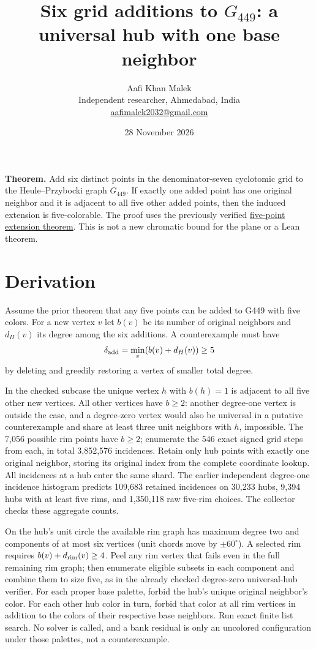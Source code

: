 \documentclass[10pt,letterpaper]{article}
\title{Six grid additions to \(G_{449}\): a universal hub with one base neighbor}
\author{Aafi Khan Malek\\ \small Independent researcher, Ahmedabad, India\\
\small\href{mailto:aafimalek2032@gmail.com}{aafimalek2032@gmail.com}}
\date{28 November 2026}
\begin{document}
\maketitle
\textbf{Theorem.} Add six distinct points in the denominator-seven
cyclotomic grid to the Heule--Przybocki graph \(G_{449}\). If exactly
one added point has one original neighbor and it is adjacent to all
five other added points, then the induced extension is five-colorable.
The proof uses the previously verified
\href{https://github.com/Aafimalek/novel-discoveries/tree/234e0ce194fdfa544d4b551ccea9898b2239dc69/hadwiger-nelson/verification/g449/prime-seven-catalogue/five-point-extensions}{five-point extension theorem}.
This is not a new chromatic bound for the plane or a Lean theorem.

\section{Derivation}\label{derivation}

Assume the prior theorem that any five points can be added to G449 with
five colors. For a new vertex \(v\) let \(b(v)\) be its number of
original neighbors and \(d_H(v)\) its degree among the six additions. A
counterexample must have \[
\delta_{\rm add}=\min_v(b(v)+d_H(v))\ge5
\] by deleting and greedily restoring a vertex of smaller total degree.

In the checked subcase the unique vertex \(h\) with \(b(h)=1\) is
adjacent to all five other new vertices. All other vertices have
\(b\ge2\): another degree-one vertex is outside the case, and a
degree-zero vertex would also be universal in a putative counterexample
and share at least three unit neighbors with \(h\), impossible. The
7,056 possible rim points have \(b\ge2\); enumerate the 546 exact signed
grid steps from each, in total 3,852,576 incidences. Retain only hub
points with exactly one original neighbor, storing its original index
from the complete coordinate lookup. All incidences at a hub enter the
same shard. The earlier independent degree-one incidence histogram
predicts 109,683 retained incidences on 30,233 hubs, 9,394 hubs with at
least five rims, and 1,350,118 raw five-rim choices. The collector
checks these aggregate counts.

On the hub's unit circle the available rim graph has maximum degree two
and components of at most six vertices (unit chords move by
\(\pm60^\circ\)). A selected rim requires \(b(v)+d_{\rm rim}(v)\ge4\).
Peel any rim vertex that fails even in the full remaining rim graph;
then enumerate eligible subsets in each component and combine them to
size five, as in the already checked degree-zero universal-hub verifier.
For each proper base palette, forbid the hub's unique original
neighbor's color. For each other hub color in turn, forbid that color at
all rim vertices in addition to the colors of their respective base
neighbors. Run exact finite list search. No solver is called, and a bank
residual is only an uncolored configuration under those palettes, not a
counterexample.
\end{document}
